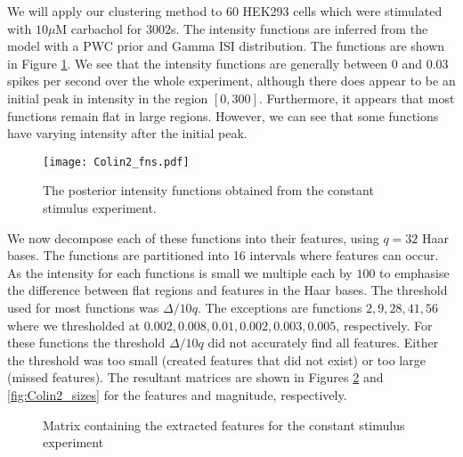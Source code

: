\documentclass[../main.tex]{subfiles}
\begin{document}
We will apply our clustering method to $60$ HEK293 cells which were stimulated with $10 \mu\mathrm{M}$ carbachol for $3002$s. The intensity functions are inferred from the model with a PWC prior and Gamma ISI distribution. The functions are shown in Figure \ref{fig:Colin2_fns}. We see that the intensity functions are generally between $0$ and $0.03$  spikes per second over the whole experiment,  although there does appear to be an initial peak in intensity in the region $[0,300]$. Furthermore, it appears that most functions remain flat in large regions. However, we can see that some functions have varying intensity after the initial peak. 

  \begin{figure}[b!]
   \hrulefill
   \begin{center} 
    {\texttt{[image: Colin2\_fns.pdf]} }
    \end{center}     
    \caption{The posterior intensity functions obtained from the constant stimulus experiment.}
    \label{fig:Colin2_fns}
    \hrulefill
    \end{figure}

We now decompose each of these functions into their features, using $q = 32$ Haar bases. The functions are partitioned into 16 intervals where features can occur. As the intensity for each functions is small we multiple each by $100$ to emphasise the difference between flat regions and features in the Haar bases. The threshold used for most functions was $\Delta /10q$. The exceptions are functions $2,9,28,41,56$ where we thresholded at $0.002, 0.008, 0.01, 0.002, 0.003, 0.005$, respectively. For these functions the threshold $\Delta /10q$ did not accurately find all features. Either the threshold was too small (created features that did not exist) or too large (missed features). The resultant matrices are shown in Figures \ref{fig:Colin2_features} and \ref{fig:Colin2_sizes} for the features and magnitude, respectively. 



	\begin{figure}
  \begin{center} 
    \end{center}     
    \caption{Matrix containing the extracted features for the constant stimulus experiment }
    \label{fig:Colin2_features}
	\end{figure}
\end{document}
